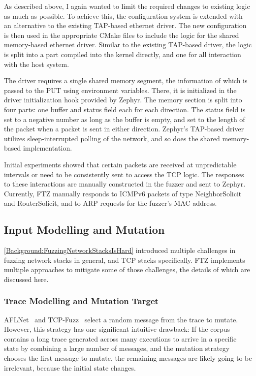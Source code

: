 \documentclass[twocolumn]{article}
\newcommand{\proj}{FTZ\xspace}
\let\savedCite=\cite
\renewcommand{\cite}{\unskip~\savedCite}
\begin{document}
As described above, I again wanted to limit the required changes to existing logic as much as possible. To achieve this, the configuration system is extended with an alternative to the existing TAP-based ethernet driver. The new configuration is then used in the appropriate CMake files to include the logic for the shared memory-based ethernet driver. Similar to the existing TAP-based driver, the logic is split into a part compiled into the kernel directly, and one for all interaction with the host system.

The driver requires a single shared memory segment, the information of which is passed to the PUT using environment variables. There, it is initialized in the driver initialization hook provided by Zephyr. The memory section is split into four parts: one buffer and status field each for each direction. The status field is set to a negative number as long as the buffer is empty, and set to the length of the packet when a packet is sent in either direction. Zephyr's TAP-based driver utilizes sleep-interrupted polling of the network, and so does the shared memory-based implementation.

Initial experiments showed that certain packets are received at unpredictable intervals or need to be consistently sent to access the TCP logic. The responses to these interactions are manually constructed in the fuzzer and sent to Zephyr. Currently, \proj manually responds to ICMPv6 packets of type NeighborSolicit and RouterSolicit, and to ARP requests for the fuzzer's MAC address.

\subsection{Input Modelling and Mutation}
\label{Implementation:InputModelling}

\cref{Background:FuzzingNetworkStacksIsHard} introduced multiple challenges in fuzzing network stacks in general, and TCP stacks specifically. \proj implements multiple approaches to mitigate some of those challenges, the details of which are discussed here.

\subsubsection{Trace Modelling and Mutation Target}
\label{Implementation:InputModelling:MutationTarget}

AFLNet\cite{AFLNET} and TCP-Fuzz\cite{TCPFuzz} select a random message from the trace to mutate. However, this strategy has one significant intuitive drawback: If the corpus contains a long trace generated across many executions to arrive in a specific state by combining a large number of messages, and the mutation strategy chooses the first message to mutate, the remaining messages are likely going to be irrelevant, because the initial state changes.
\end{document}
